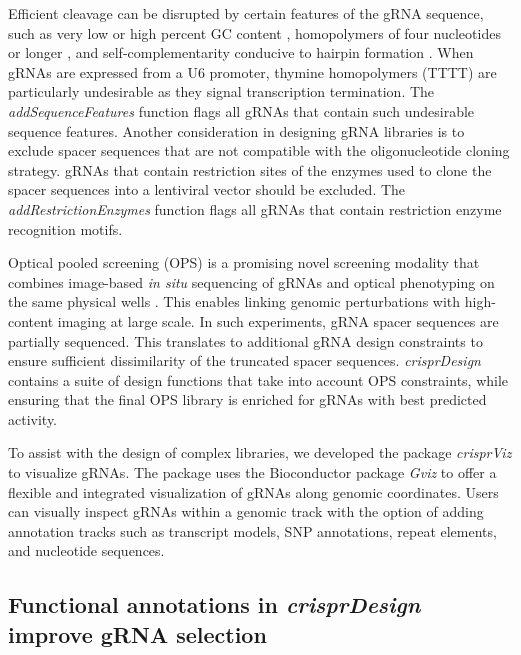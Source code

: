 \documentclass[pdftex,english,10pt]{article}
\begin{document}
Efficient cleavage can be disrupted by certain features of the gRNA sequence, such as very low or high percent GC content \citep{chen2018improved, doench2014rational, wang2014genetic}, homopolymers of four nucleotides or longer \citep{gilbert2014genomescale, pincer}, and self-complementarity conducive to hairpin formation \citep{thyme2016internal, labun2016chopchop}. When gRNAs are expressed from a U6 promoter, thymine homopolymers (TTTT) are particularly undesirable as they signal transcription termination. The \textit{addSequenceFeatures} function flags all gRNAs that contain such undesirable sequence features. Another consideration in designing gRNA libraries is to exclude spacer sequences that are not compatible with the oligonucleotide cloning strategy. gRNAs that contain restriction sites of the enzymes used to clone the spacer sequences into a lentiviral vector should be excluded. The \textit{addRestrictionEnzymes} function flags all gRNAs that contain restriction enzyme recognition motifs.

Optical pooled screening (OPS) is a promising novel screening modality that combines image-based \textit{in situ} sequencing of gRNAs and optical phenotyping on the same physical wells \citep{ops}. This enables linking genomic perturbations with high-content imaging at large scale. In such experiments, gRNA spacer sequences are partially sequenced. This translates to additional gRNA design constraints to ensure sufficient dissimilarity of the truncated spacer sequences.  \textit{crisprDesign} contains a suite of design functions that take into account OPS constraints, while ensuring that the final OPS library is enriched for gRNAs with best predicted activity. 


To assist with the design of complex libraries, we developed the package \textit{crisprViz} to visualize gRNAs.
The package uses the Bioconductor package \textit{Gviz} \citep{gviz} to offer a flexible and integrated visualization of gRNAs along genomic coordinates. 
Users can visually inspect gRNAs within a genomic track with the option of adding annotation tracks such as transcript models, SNP annotations, repeat elements, and nucleotide sequences. 





\subsection{Functional annotations in \textit{crisprDesign} improve gRNA selection}
\end{document}
